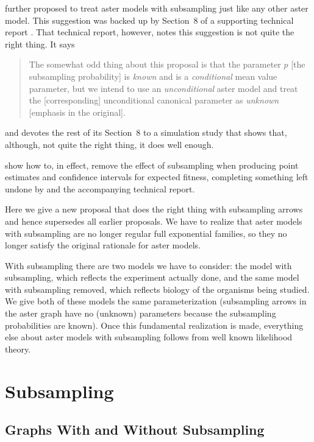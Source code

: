 \citet{aster2} further proposed to treat aster models with subsampling
just like any other aster model.  This suggestion was backed
up by Section~8 of a supporting technical report \citep{tr661}.
That technical report, however, notes
this suggestion is not quite the right thing.  It says
\begin{quote}
The somewhat odd thing about this proposal is that the parameter
$p$ [the subsampling probability] is \emph{known} and is a \emph{conditional}
mean value parameter, but we intend to use an \emph{unconditional} aster model
and treat the [corresponding] unconditional canonical parameter as
\emph{unknown} [emphasis in the original].
\end{quote}
and devotes the rest of its Section~8 to a simulation study that shows
that, although, not quite the right thing, it does well enough.

\citet*[Appendix~S1]{stanton-geddes-et-al} show how to, in effect, remove
the effect of subsampling when producing point estimates and confidence
intervals for expected fitness, completing something left undone by
\citet{aster2} and the accompanying technical report.

Here we give a new proposal that does the right thing with subsampling
arrows and hence supersedes all earlier proposals.
We have to realize that aster models with subsampling are no longer
regular full exponential families, so they no longer satisfy the original
rationale for aster models.

With subsampling there are two models we have to consider: the model with
subsampling, which reflects the experiment actually done, and the same model
with subsampling removed, which reflects biology of the organisms being
studied.  We give both of these models the same parameterization (subsampling
arrows in the aster graph have no (unknown) parameters because the subsampling
probabilities are known).  Once this fundamental realization is made,
everything else about aster models with subsampling follows from well
known likelihood theory.

\section{Subsampling}

\subsection{Graphs With and Without Subsampling}
\label{sec:with-and-without}

